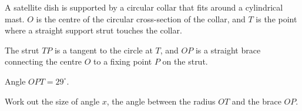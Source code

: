 \begin{question}
\noindent A satellite dish is supported by a circular collar that fits around a cylindrical mast. $O$ is the centre of the circular cross-section of the collar, and $T$ is the point where a straight support strut touches the collar.

The strut $TP$ is a tangent to the circle at $T$, and $OP$ is a straight brace connecting the centre $O$ to a fixing point $P$ on the strut.

\begin{center}
\end{center}

\noindent Angle $OPT = 29^\circ$.

Work out the size of angle $x$, the angle between the radius $OT$ and the brace $OP$.
\vspace{4.5cm}
\end{question}
